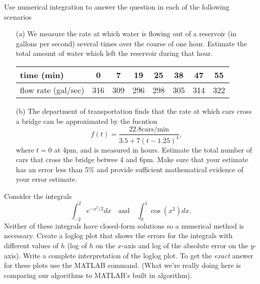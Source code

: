 \begin{problem}
    Use numerical integration to answer the question in each of the following scenarios
    \begin{enumerate}
        \item[(a)] We measure the rate at which water is flowing out of a reservoir (in
            gallons per second) several times over the course of one hour.  Estimate the
            total amount of water which left the reservoir during that hour.
            \begin{center}
                \begin{tabular}{|l||c|c|c|c|c|c|c|}
                    \hline
                    time (min) & 0 & 7 & 19 & 25 & 38 & 47 & 55 \\ \hline
                    flow rate (gal/sec) & 316 & 309 & 296 & 298 & 305 & 314 & 322 \\ \hline
                \end{tabular}
            \end{center}
        \item[(b)] The department of transportation finds that the rate at which cars
            cross a bridge can be approximated by the fucntion
            \[ f(t) = \frac{22.8 \text{cars/min}}{3.5 + 7(t-1.25)^4}, \]
            where $t=0$ at 4pm, and is measured in hours.  Estimate the total number of
            cars that cross the bridge betwee 4 and 6pm.  Make sure that your estimate has
            an error less than 5\% and provide sufficient mathematical evidence of your
            error estimate.
    \end{enumerate}
\end{problem}


\begin{problem}
    Consider the integrals 
    \[ \int_{-2}^2 e^{-x^2/2} dx \quad \text{and} \quad \int_0^1 \cos(x^2) dx. \]
    Neither of these integrals have closed-form solutions so a numerical method is
    necessary.  Create a loglog plot that shows the errors for the integrals with different values of $h$ (log
    of $h$ on the $x$-axis and log of the absolute error on the $y$-axis).
    Write a complete interpretation of the loglog plot.  
    To get the {\it exact} answer for these plots use the MATLAB  command.
    (What we're really doing here is comparing our algorithms to MATLAB's built in algorithm).
\end{problem}


